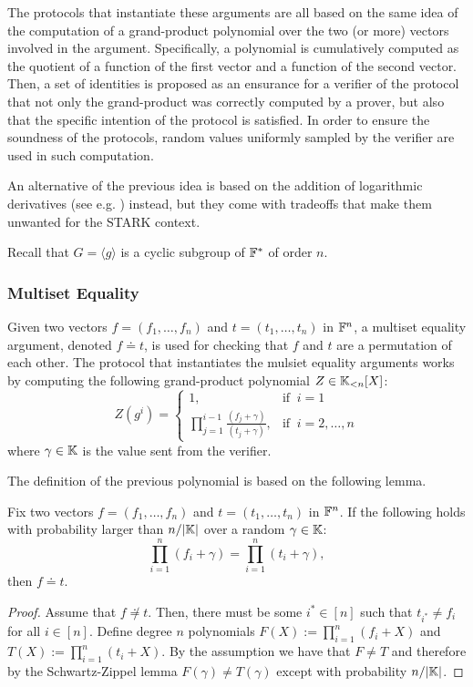 The protocols that instantiate these arguments are all based on the same idea of the computation of a grand-product polynomial over the two (or more) vectors involved in the argument. Specifically, a polynomial is cumulatively computed as the quotient of a function of the first vector and a function of the second vector. Then, a set of identities is proposed as an ensurance for a verifier of the protocol that not only the grand-product was correctly computed by a prover, but also that the specific intention of the protocol is satisfied. In order to ensure the soundness of the protocols, random values uniformly sampled by the verifier are used in such computation.

An alternative of the previous idea is based on the addition of logarithmic derivatives (see e.g. \cite{EPRINT:Habock22M}) instead, but they come with tradeoffs that make them unwanted for the STARK context. 

Recall that $G = \langle g \rangle$ is a cyclic subgroup of $\mathbb{F}^*$ of order $n$.

\subsubsection*{Multiset Equality}

Given two vectors $f = (f_1, \dots, f_n)$ and $t = (t_1, \dots, t_n)$ in $\mathbb{F}^n$, a multiset equality argument, denoted $f \doteq t$, is used for checking that $f$ and $t$ are a permutation of each other. The protocol that instantiates the mulsiet equality arguments works by computing the following grand-product polynomial $Z \in \mathbb{K}_{<n}[X]$:
\[
  Z(g^i) = 
  \begin{cases} 
  1, & \text{if }~ i=1 \\ 
  \displaystyle\prod_{j=1}^{i-1} \frac{(f_j + \gamma)}{(t_j + \gamma)}, & \text{if }~ i = 2, \dots, n
  \end{cases} 
\]
where $\gamma \in \mathbb{K}$ is the value sent from the verifier. 

The definition of the previous polynomial is based on the following lemma.
\begin{lemma}\label{lemma:muleq-soundness}
  Fix two vectors $f = (f_1, \dots, f_n)$ and $t = (t_1, \dots, t_n)$ in $\mathbb{F}^n$. If the following holds with probability larger than $n/|\mathbb{K}|$ over a random $\gamma \in \mathbb{K}$:
  \begin{equation*}
  \prod_{i=1}^n (f_i + \gamma) = \prod_{i=1}^n (t_i + \gamma),
  \end{equation*}
  then $f \doteq t$. 
\end{lemma}
\begin{proof}
  Assume that $f \not\doteq t$. Then, there must be some $i^* \in [n]$ such that $t_{i^*} \neq f_i$ for all $i \in [n]$. Define degree $n$ polynomials $F(X) := \prod_{i=1}^n (f_i + X)$ and $T(X) := \prod_{i=1}^n (t_i + X)$. By the assumption we have that $F \neq T$ and therefore by the Schwartz-Zippel lemma $F(\gamma) \neq T(\gamma)$ except with probability $n/|\mathbb{K}|$.
\end{proof}

